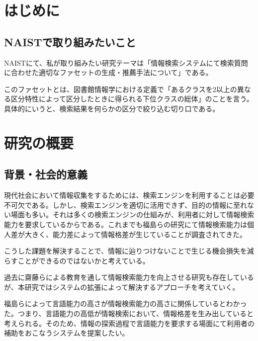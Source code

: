\documentclass[a4j,10pt, twocolumn]{jarticle} \usepackage[dvipdfmx]{graphicx} \usepackage{amssymb} \usepackage{amsmath}
\begin{document}
\section{はじめに}
\subsection{NAISTで取り組みたいこと}
NAISTにて、私が取り組みたい研究テーマは「情報検索システムにて検索質問に合わせた適切なファセットの生成・推薦手法について」である。

このファセットとは、図書館情報学における定義で「あるクラスを2以上の異なる区分特性によって区分したときに得られる下位クラスの総体\cite{libdic}」のことを言う。具体的にいうと、検索結果を何らかの区分で絞り込む切り口である。
\section{研究の概要}
\subsection{背景・社会的意義}
 現代社会において情報収集をするためには、検索エンジンを利用することは必要不可欠である。しかし、検索エンジンを適切に活用できず、目的の情報に至れない場面も多い。それは多くの検索エンジンの仕組みが、利用者に対して情報検索能力を要求しているからである。これまでも福島らの研究にて情報検索能力は個人差が大きく、能力差によって情報格差が生じていることが調査されてきた\cite{fukushima}。

 こうした課題を解決することで、情報に辿りつけないことで生じる機会損失を減らすことができるのではないかと考えている。
 
 過去に齋藤らによる教育を通して情報検索能力を向上させる研究\cite{saito}も存在しているが、本研究ではシステムの拡張によって解決するアプローチを考えていく。

 福島らによって言語能力の高さが情報検索能力の高さに関係しているとわかった\cite{fukushima}。つまり、言語能力の高低が情報検索において、情報格差を生み出していると考えられる。そのため、情報の探索過程で言語能力を要求する場面にて利用者の補助をおこなうシステムを提案したい。
\end{document}

